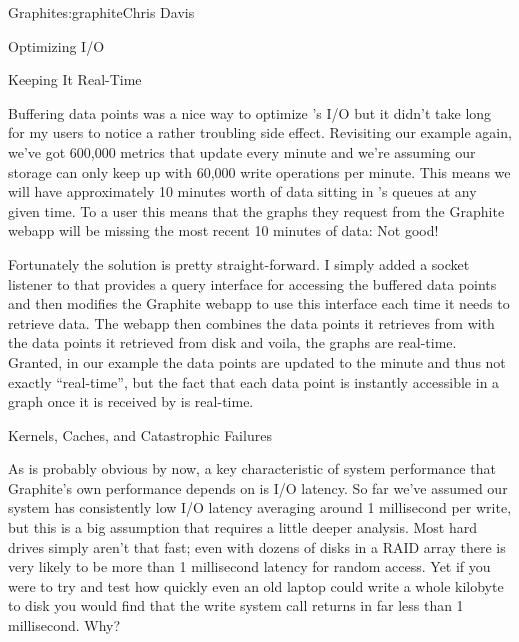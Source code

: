 \begin{aosachapter}{Graphite}{s:graphite}{Chris Davis}
\begin{aosasect1}{Optimizing I/O}

\end{aosasect1}

\begin{aosasect1}{Keeping It Real-Time}

Buffering data points was a nice way to optimize 's I/O but it
didn't take long for my users to notice a rather troubling side
effect.  Revisiting our example again, we've got 600,000 metrics that
update every minute and we're assuming our storage can only keep up
with 60,000 write operations per minute. This means we will have
approximately 10 minutes worth of data sitting in 's queues at
any given time.  To a user this means that the graphs they request
from the Graphite webapp will be missing the most recent 10 minutes of
data: Not good!

Fortunately the solution is pretty straight-forward. I simply added a
socket listener to  that provides a query interface for
accessing the buffered data points and then modifies the Graphite
webapp to use this interface each time it needs to retrieve data.  The
webapp then combines the data points it retrieves from  with the
data points it retrieved from disk and voila, the graphs are
real-time. Granted, in our example the data points are updated to the
minute and thus not exactly ``real-time'', but the fact that each data
point is instantly accessible in a graph once it is received by 
is real-time.

\end{aosasect1}

\vspace{-0.1cm} %

\begin{aosasect1}{Kernels, Caches, and Catastrophic Failures}

\vspace{-0.1cm} %

As is probably obvious by now, a key characteristic of system
performance that Graphite's own performance depends on is I/O latency.
So far we've assumed our system has consistently low I/O latency
averaging around 1 millisecond per write, but this is a big assumption
that requires a little deeper analysis. Most hard drives simply aren't
that fast; even with dozens of disks in a RAID array there is very
likely to be more than 1 millisecond latency for random access. Yet if
you were to try and test how quickly even an old laptop could write a
whole kilobyte to disk you would find that the write system call
returns in far less than 1 millisecond. Why?


\end{aosasect1}
\end{aosachapter}
